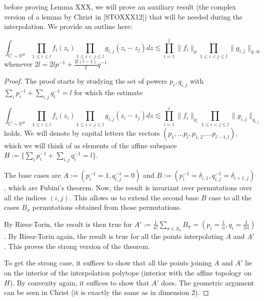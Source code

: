 	before proving Lemma XXX, we will prove an auxiliary result (the complex version of a lemma by Christ in [STOXXX12]) that will be needed during the interpolation. We provide an outline here:

	\begin{lemma}
		


	\begin{equation}
		\int_{\mathbb C^l \sim \mathbb R^{2l}} \prod_{1\le i\le l}f_i(z_i) \prod_{1\le i<j\le l} g_{i,j}(z_i-z_j) dz \lesssim \prod_{i=1}^l \|f_i\|_p \prod_{1\le i<j\le l} \|g_{i,j}\|_{q,\infty}
	\end{equation} 
	whenever $ 2 l =  2 l p^{-1} + \frac{2 l (l-1)}{2} q^{-1}$

	\end{lemma}
	\begin{proof}
	The proof starts by studying the set of powers $p_i, q_{i,j}$ with $\sum_{i} p_i^{-1} + \sum_{i,j} q_i^{-1} = l$ for which the estimate

	\begin{equation}
		\int_{\mathbb C^l \sim \mathbb R^{2l}} \prod_{1\le i\le l}f_i(z_i) \prod_{1\le i<j\le l} g_{i,j}(z_i-z_j) dz \lesssim \prod_{i=1}^l \|f_i\|_{p_i} \prod_{1\le i<j\le l} \|g_{i,j}\|_{q_{i,j}}
	\end{equation} 
	holds. We will denote by capital letters the vectors $(p_1, \dots p_l, p_{1,2}, \dots p_{l-1,l})$, which we will think of as elements of the affine subspace $H:=\{\sum_{i} p_i^{-1} + \sum_{i,j} q_i^{-1} = l\}$.


	The base cases are $A:=(p_{i}^{-1}=1, q_{i,j}^{-1} = 0)$ and $B:=(p_{i}^{-1}=\delta_{i,1}, q_{i,j}^{-1} = \delta_{i+1,j})$, which are Fubini's theorem. Now, the result is invariant over permutations over all the indices $(i,j)$. This allows us to extend the second base $B$ case to all the cases $B_\sigma$ permutations obtained from those permutations.

	By Riesz-Torin, the result is then true for $A':=\frac 1 {n!} \sum_{\sigma \in S_n} B_\sigma = (p_i = \frac 1 n, q_i = \frac 1 {2n})$. By Riesz-Torin again, the result is true for all the points interpolating $A$ and $A'$. This proves the strong version of the theorem.

	To get the strong case, it suffices to show that all the points joining $A$ and $A'$ lie on the interior of the interpolation polytope (interior with the affine topology on $H$). By convexity again, it suffices to show that $A'$ does. The geometric argument can be seen in Christ (it is exactly the same as in dimension 2). 
	\end{proof}
